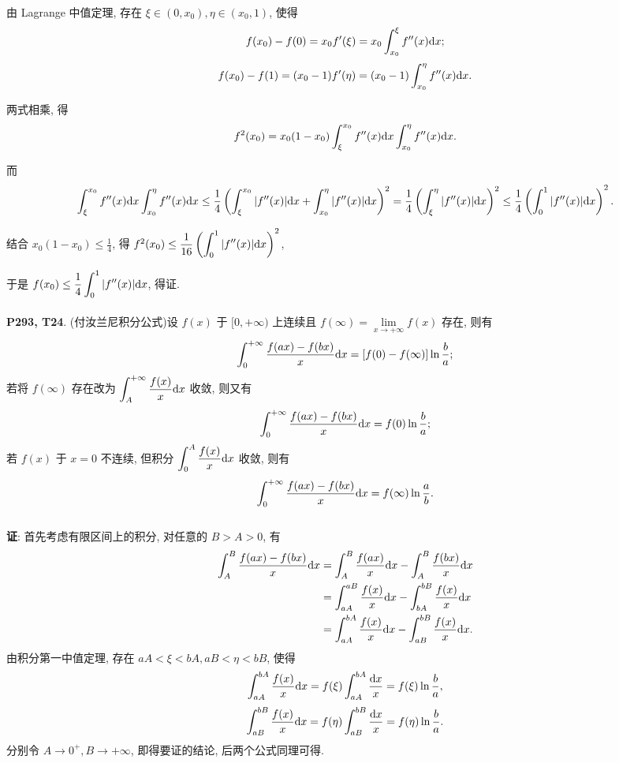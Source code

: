 \documentclass[UTF8]{ctexart}
\begin{document}
由 Lagrange 中值定理, 存在 $\xi\in(0,x_0),\eta\in(x_0,1)$, 使得
\[
  f(x_0)-f(0)=x_0f'(\xi)=x_0\int_{x_0}^{\xi}f''(x){\rm d}x;
\]
\[
f(x_0)-f(1)=(x_0-1)f'(\eta)=(x_0-1)\int_{x_0}^{\eta}f''(x){\rm d}x.
\]

两式相乘, 得
\[
f^2(x_0)=x_0(1-x_0)\int_{\xi}^{x_0}f''(x){\rm d}x\int_{x_0}^{\eta}f''(x){\rm d}x.
\]

而
\[
\int_{\xi}^{x_0}f''(x){\rm d}x\int_{x_0}^{\eta}f''(x){\rm d}x\leq\frac{1}{4}\left(\int_{\xi}^{x_0}|f''(x)|{\rm d}x+\int_{x_0}^{\eta}|f''(x)|{\rm d}x\right)^2=\frac{1}{4}\left(\int_{\xi}^{\eta}|f''(x)|{\rm d}x\right)^2\leq\frac{1}{4}\left(\int_{0}^{1}|f''(x)|{\rm d}x\right)^2.
\]

结合 $x_0(1-x_0)\leq\displaystyle\frac{1}{4}$, 得 $f^2(x_0)\leq\displaystyle\frac{1}{16}\left(\int_{0}^{1}|f''(x)|{\rm d}x\right)^2$,

于是 $f(x_0)\leq\displaystyle\frac{1}{4}\int_{0}^{1}|f''(x)|{\rm d}x$, 得证.
~\\
~\\

\textbf{P293, T24}. (付汝兰尼积分公式)设 $f(x)$ 于 $[0,+\infty)$ 上连续且 $f(\infty)=\displaystyle\lim\limits_{x\rightarrow+\infty}f(x)$ 存在, 则有
\[
\int_{0}^{+\infty}\frac{f(ax)-f(bx)}{x}{\rm d}x=[f(0)-f(\infty)]\ln\frac{b}{a};
\]
若将 $f(\infty)$ 存在改为 $\displaystyle\int_{A}^{+\infty}\frac{f(x)}{x}{\rm d}x$ 收敛, 则又有
\[
\int_{0}^{+\infty}\frac{f(ax)-f(bx)}{x}{\rm d}x=f(0)\ln\frac{b}{a};
\]
若 $f(x)$ 于 $x=0$ 不连续, 但积分 $\displaystyle\int_{0}^{A}\frac{f(x)}{x}{\rm d}x$ 收敛, 则有
\[
\int_{0}^{+\infty}\frac{f(ax)-f(bx)}{x}{\rm d}x=f(\infty)\ln\frac{a}{b}.
\]
~\\

\textbf{证}: 首先考虑有限区间上的积分, 对任意的 $B>A>0$, 有
\[
\begin{aligned}
    \int_{A}^{B}\frac{f(ax)-f(bx)}{x}{\rm d}x&=\int_{A}^{B}\frac{f(ax)}{x}{\rm d}x-\int_{A}^{B}\frac{f(bx)}{x}{\rm d}x \\
                                             &=\int_{aA}^{aB}\frac{f(x)}{x}{\rm d}x-\int_{bA}^{bB}\frac{f(x)}{x}{\rm d}x \\
                                             &=\int_{aA}^{bA}\frac{f(x)}{x}{\rm d}x-\int_{aB}^{bB}\frac{f(x)}{x}{\rm d}x.
\end{aligned}
\]
由积分第一中值定理, 存在 $aA<\xi<bA,aB<\eta<bB$, 使得
\[
\int_{aA}^{bA}\frac{f(x)}{x}{\rm d}x=f(\xi)\int_{aA}^{bA}\frac{{\rm d}x}{x}=f(\xi)\ln\frac{b}{a},
\]
\[
\int_{aB}^{bB}\frac{f(x)}{x}{\rm d}x=f(\eta)\int_{aB}^{bB}\frac{{\rm d}x}{x}=f(\eta)\ln\frac{b}{a}.
\]
分别令 $A\rightarrow0^+,B\rightarrow+\infty$, 即得要证的结论, 后两个公式同理可得.
\end{document}
